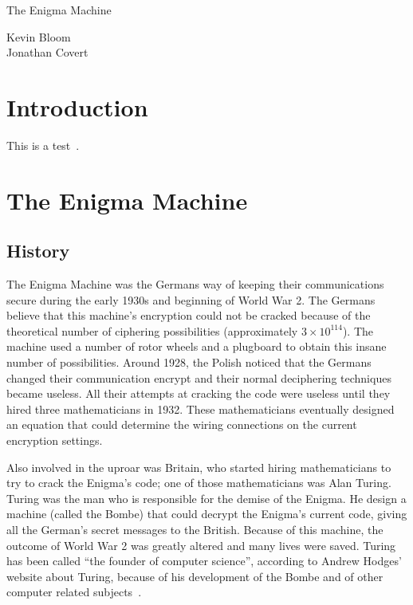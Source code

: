 \documentclass[12pt,a4paper,titlepage]{article}
\begin{document}
\pagestyle{headings}
\setcounter{page}{1}

\thispagestyle{empty}

\begin{flushleft}
\vspace*{1.5in}

{\huge The Enigma Machine}

\vspace{0.25in}

{\Large Kevin Bloom \\ Jonathan Covert}

\vspace{0.25in}

\vfill

\end{flushleft}

\newpage

\tableofcontents

\newpage

\section{Introduction}
This is a test~\cite{hold}.

\section{The Enigma Machine}

\subsection{History}
The Enigma Machine was the Germans way of keeping their communications secure 
during the early 1930s and beginning of World War 2. The Germans believe that 
this machine's encryption could not be cracked because of the theoretical number 
of ciphering possibilities (approximately $3 \times 10^{114}$). The machine used 
a number of rotor wheels and a plugboard to obtain this insane number of 
possibilities. Around 1928, the Polish noticed that the Germans changed their 
communication encrypt and their normal deciphering techniques became useless. 
All their attempts at cracking the code were useless until they hired three 
mathematicians in 1932. These mathematicians eventually designed an equation 
that could determine the wiring connections on the current encryption 
settings.

Also involved in the uproar was Britain, who started hiring mathematicians to
try to crack the Enigma's code; one of those mathematicians was Alan Turing.
Turing was the man who is responsible for the demise of the Enigma. He design a
machine (called the Bombe) that could decrypt the Enigma's current code, giving
all the German's secret messages to the British. Because of this machine, the
outcome of World War 2 was greatly altered and many lives were saved. Turing has
been called ``the founder of computer science'', according to Andrew Hodges'
website about Turing, because of his development of the Bombe and of other
computer related subjects~\cite{wilcox2006solving}.
\end{document}
